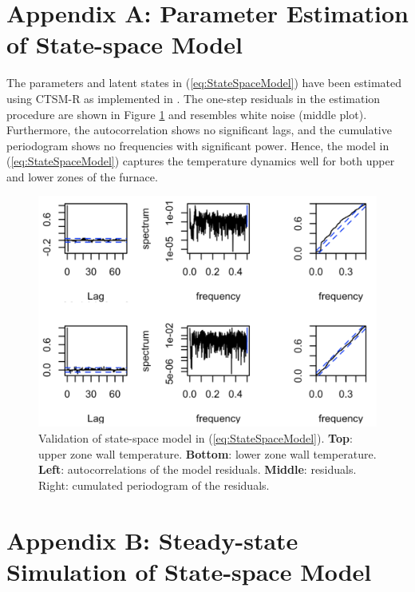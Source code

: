 \documentclass[conference]{IEEEtran}
\begin{document}
{\appendices
\vspace{-1mm}


\section*{Appendix A: Parameter Estimation of State-space Model}\label{app:parameter-estimation}


The parameters and latent states in (\ref{eq:StateSpaceModel}) have been estimated using CTSM-R \cite{juhl2016ctsmr} as implemented in \cite{code}. The one-step residuals in the estimation procedure are shown in Figure \ref{fig:4thOrderModelValidation} and resembles white noise (middle plot). Furthermore, the autocorrelation shows no significant lags, and the cumulative periodogram shows no frequencies with significant power. Hence, the model in (\ref{eq:StateSpaceModel}) captures the temperature dynamics well for both  upper and lower zones of the furnace.


\begin{figure}[t]
    \centering
    \includegraphics[width=\columnwidth]{../figures/4thOrderModelValidation_V2.png}
    \caption{Validation of state-space model in (\ref{eq:StateSpaceModel}). \textbf{Top}: upper zone wall temperature. \textbf{Bottom}: lower zone wall temperature. \textbf{Left}: autocorrelations of the model residuals. \textbf{Middle}: residuals. \textrm{Right}: cumulated periodogram of the residuals.}
    \label{fig:4thOrderModelValidation}
\end{figure}

\section*{Appendix B: Steady-state Simulation of State-space Model}\label{app:steady-state-simulation}


}
\end{document}
